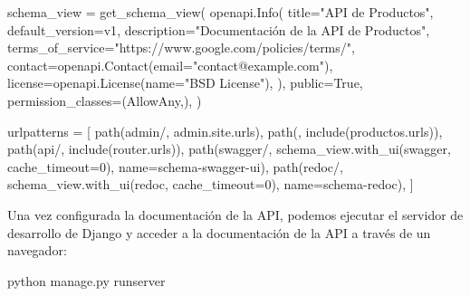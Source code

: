 \documentclass[
  a4paper,
  DIV=11,
  numbers=noendperiod,
  onepage,
  openany]{scrreprt}
\newenvironment{Shaded}{\begin{snugshade}}{\end{snugshade}}
\newcommand{\DecValTok}[1]{\textcolor[rgb]{0.68,0.00,0.00}{#1}}
\newcommand{\ExtensionTok}[1]{\textcolor[rgb]{0.00,0.23,0.31}{#1}}
\newcommand{\NormalTok}[1]{\textcolor[rgb]{0.00,0.23,0.31}{#1}}
\newcommand{\OperatorTok}[1]{\textcolor[rgb]{0.37,0.37,0.37}{#1}}
\newcommand{\StringTok}[1]{\textcolor[rgb]{0.13,0.47,0.30}{#1}}
\newcommand{\VariableTok}[1]{\textcolor[rgb]{0.07,0.07,0.07}{#1}}
\begin{document}
\begin{tcolorbox}
\begin{Shaded}
\begin{Highlighting}[]
\NormalTok{schema\_view }\OperatorTok{=}\NormalTok{ get\_schema\_view(}
\NormalTok{   openapi.Info(}
\NormalTok{      title}\OperatorTok{=}\StringTok{"API de Productos"}\NormalTok{,}
\NormalTok{      default\_version}\OperatorTok{=}\StringTok{\textquotesingle{}v1\textquotesingle{}}\NormalTok{,}
\NormalTok{      description}\OperatorTok{=}\StringTok{"Documentación de la API de Productos"}\NormalTok{,}
\NormalTok{      terms\_of\_service}\OperatorTok{=}\StringTok{"https://www.google.com/policies/terms/"}\NormalTok{,}
\NormalTok{      contact}\OperatorTok{=}\NormalTok{openapi.Contact(email}\OperatorTok{=}\StringTok{"contact@example.com"}\NormalTok{),}
\NormalTok{      license}\OperatorTok{=}\NormalTok{openapi.License(name}\OperatorTok{=}\StringTok{"BSD License"}\NormalTok{),}
\NormalTok{   ),}
\NormalTok{   public}\OperatorTok{=}\VariableTok{True}\NormalTok{,}
\NormalTok{   permission\_classes}\OperatorTok{=}\NormalTok{(AllowAny,),}
\NormalTok{)}

\NormalTok{urlpatterns }\OperatorTok{=}\NormalTok{ [}
\NormalTok{    path(}\StringTok{\textquotesingle{}admin/\textquotesingle{}}\NormalTok{, admin.site.urls),}
\NormalTok{    path(}\StringTok{\textquotesingle{}\textquotesingle{}}\NormalTok{, include(}\StringTok{\textquotesingle{}productos.urls\textquotesingle{}}\NormalTok{)),}
\NormalTok{    path(}\StringTok{\textquotesingle{}api/\textquotesingle{}}\NormalTok{, include(router.urls)),}
\NormalTok{    path(}\StringTok{\textquotesingle{}swagger/\textquotesingle{}}\NormalTok{, schema\_view.with\_ui(}\StringTok{\textquotesingle{}swagger\textquotesingle{}}\NormalTok{, cache\_timeout}\OperatorTok{=}\DecValTok{0}\NormalTok{), name}\OperatorTok{=}\StringTok{\textquotesingle{}schema{-}swagger{-}ui\textquotesingle{}}\NormalTok{),}
\NormalTok{    path(}\StringTok{\textquotesingle{}redoc/\textquotesingle{}}\NormalTok{, schema\_view.with\_ui(}\StringTok{\textquotesingle{}redoc\textquotesingle{}}\NormalTok{, cache\_timeout}\OperatorTok{=}\DecValTok{0}\NormalTok{), name}\OperatorTok{=}\StringTok{\textquotesingle{}schema{-}redoc\textquotesingle{}}\NormalTok{),}
\NormalTok{]}
\end{Highlighting}
\end{Shaded}

Una vez configurada la documentación de la API, podemos ejecutar el
servidor de desarrollo de Django y acceder a la documentación de la API
a través de un navegador:

\begin{Shaded}
\begin{Highlighting}[]
\ExtensionTok{python}\NormalTok{ manage.py runserver}
\end{Highlighting}
\end{Shaded}


\end{tcolorbox}
\end{document}
